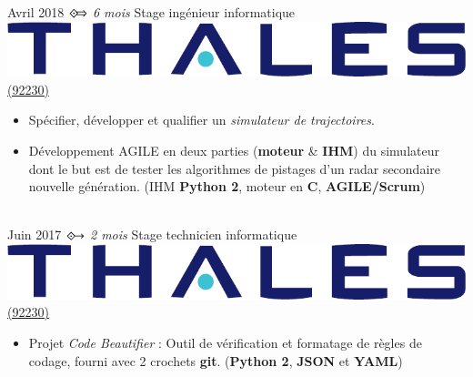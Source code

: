 \documentclass[letterpaper]{twentysecondcv} %
\begin{document}
\begin{twenty}

    
    \twentyitem
    	{Avril 2018}
		{$\DiamonddotRight$\textit{\small{ 6 mois}}}
        {Stage ingénieur informatique}
        {\href{https://www.thalesgroup.com/fr/worldwide/defense/practical-information}{\includegraphics[scale=0.35]{img/thales-logo.png} \hspace{0.5cm} (92230)}}
        {}
        {\vspace{-0.20cm}
            \begin{itemize}
                \item Spécifier, développer et qualifier un \textit{simulateur de trajectoires}.%
                \item Développement AGILE en deux parties (\textbf{moteur} \& \textbf{IHM}) du simulateur dont le but est de tester les algorithmes de pistages d'un radar secondaire nouvelle génération. (IHM \textbf{Python 2}, moteur en \textbf{C}, \textbf{AGILE/Scrum})
            \end{itemize}
            \vspace{-0.20cm}
        }
        \\
    \twentyitem
    	{Juin 2017}
		{$\Diamonddotright$\textit{\small{ 2 mois}}}
        {Stage technicien informatique}
        {\href{https://www.thalesgroup.com/fr/worldwide/defense/practical-information}{\includegraphics[scale=0.35]{img/thales-logo.png} \hspace{0.5cm} (92230)}}
        {}
        {\vspace{-0.20cm}
            \begin{itemize}
                \item Projet \textit{Code Beautifier} : Outil de vérification et formatage de règles de codage, fourni avec 2 crochets \textbf{git}. (\textbf{Python 2}, \textbf{JSON} et \textbf{YAML})
            \end{itemize}
}
\end{twenty}
\end{document}
